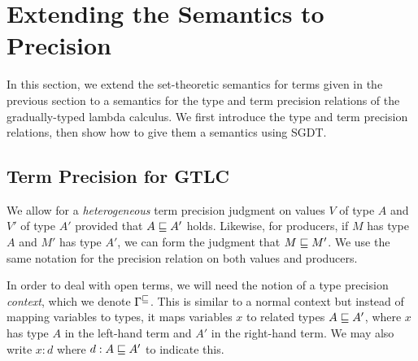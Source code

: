 \section{Extending the Semantics to Precision}\label{sec:gtlc-precision}

In this section, we extend the set-theoretic semantics for terms given in
the previous section to a semantics for the type and term precision relations
of the gradually-typed lambda calculus. We first introduce the type and term precision
relations, then show how to give them a semantics using SGDT.



\subsection{Term Precision for GTLC}\label{sec:gtlc-term-precision-axioms}



We allow for a \emph{heterogeneous} term precision judgment on values $V$ of type
$A$ and $V'$ of type $A'$ provided that $A \sqsubseteq A'$ holds. Likewise, for producers,
if $M$ has type $A$ and $M'$ has type $A'$, we can form the judgment that $M \sqsubseteq M'$.
We use the same notation for the precision relation on both values and producers.

In order to deal with open terms, we will need the notion of a type precision \emph{context}, which we denote
$\Gamma^\sqsubseteq$. This is similar to a normal context but instead of mapping variables to types,
it maps variables $x$ to related types $A \sqsubseteq A'$, where $x$ has type $A$ in the left-hand term
and $A'$ in the right-hand term. We may also write $x : d$ where $d : A \sqsubseteq A'$ to indicate this.


